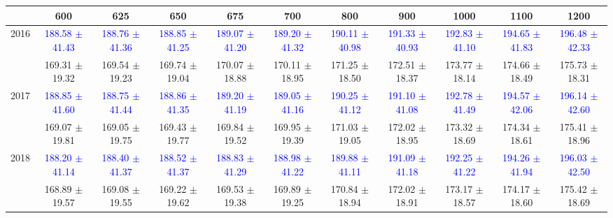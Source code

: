 {
\renewcommand{\arraystretch}{1.0}
\begin{center}
\begin{small}
\begin{tabular}{ccccccccccc}
\hline\hline
 & 600 & 625 & 650 & 675 & 700 & 800 & 900 & 1000 & 1100 & 1200 \\
\hline
\multirow{2}{*}{2016} & \textcolor{blue}{188.58 $\pm$ 41.43} & \textcolor{blue}{188.76 $\pm$ 41.36} & \textcolor{blue}{188.85 $\pm$ 41.25} & \textcolor{blue}{189.07 $\pm$ 41.20} & \textcolor{blue}{189.20 $\pm$ 41.32} & \textcolor{blue}{190.11 $\pm$ 40.98} & \textcolor{blue}{191.33 $\pm$ 40.93} & \textcolor{blue}{192.83 $\pm$ 41.10} & \textcolor{blue}{194.65 $\pm$ 41.83} & \textcolor{blue}{196.48 $\pm$ 42.33} \\
 & \textcolor{myred}{169.31 $\pm$ 19.32} & \textcolor{myred}{169.54 $\pm$ 19.23} & \textcolor{myred}{169.74 $\pm$ 19.04} & \textcolor{myred}{170.07 $\pm$ 18.88} & \textcolor{myred}{170.11 $\pm$ 18.95} & \textcolor{myred}{171.25 $\pm$ 18.50} & \textcolor{myred}{172.51 $\pm$ 18.37} & \textcolor{myred}{173.77 $\pm$ 18.14} & \textcolor{myred}{174.66 $\pm$ 18.49} & \textcolor{myred}{175.73 $\pm$ 18.31} \\
\hline
\multirow{2}{*}{2017} & \textcolor{blue}{188.85 $\pm$ 41.60} & \textcolor{blue}{188.75 $\pm$ 41.44} & \textcolor{blue}{188.86 $\pm$ 41.35} & \textcolor{blue}{189.20 $\pm$ 41.19} & \textcolor{blue}{189.05 $\pm$ 41.16} & \textcolor{blue}{190.25 $\pm$ 41.12} & \textcolor{blue}{191.10 $\pm$ 41.08} & \textcolor{blue}{192.78 $\pm$ 41.49} & \textcolor{blue}{194.57 $\pm$ 42.06} & \textcolor{blue}{196.14 $\pm$ 42.60} \\
 & \textcolor{myred}{169.07 $\pm$ 19.81} & \textcolor{myred}{169.05 $\pm$ 19.75} & \textcolor{myred}{169.43 $\pm$ 19.77} & \textcolor{myred}{169.84 $\pm$ 19.52} & \textcolor{myred}{169.95 $\pm$ 19.39} & \textcolor{myred}{171.03 $\pm$ 19.05} & \textcolor{myred}{172.02 $\pm$ 18.95} & \textcolor{myred}{173.32 $\pm$ 18.69} & \textcolor{myred}{174.34 $\pm$ 18.61} & \textcolor{myred}{175.41 $\pm$ 18.96} \\
\hline
\multirow{2}{*}{2018} & \textcolor{blue}{188.20 $\pm$ 41.14} & \textcolor{blue}{188.40 $\pm$ 41.37} & \textcolor{blue}{188.52 $\pm$ 41.37} & \textcolor{blue}{188.83 $\pm$ 41.29} & \textcolor{blue}{188.98 $\pm$ 41.22} & \textcolor{blue}{189.88 $\pm$ 41.11} & \textcolor{blue}{191.09 $\pm$ 41.18} & \textcolor{blue}{192.25 $\pm$ 41.22} & \textcolor{blue}{194.26 $\pm$ 41.94} & \textcolor{blue}{196.03 $\pm$ 42.50} \\
 & \textcolor{myred}{168.89 $\pm$ 19.57} & \textcolor{myred}{169.08 $\pm$ 19.55} & \textcolor{myred}{169.22 $\pm$ 19.62} & \textcolor{myred}{169.53 $\pm$ 19.38} & \textcolor{myred}{169.89 $\pm$ 19.25} & \textcolor{myred}{170.84 $\pm$ 18.94} & \textcolor{myred}{172.02 $\pm$ 18.91} & \textcolor{myred}{173.17 $\pm$ 18.57} & \textcolor{myred}{174.17 $\pm$ 18.60} & \textcolor{myred}{175.42 $\pm$ 18.69} \\
\hline\hline
\end{tabular}
\end{small}
\end{center}
}

